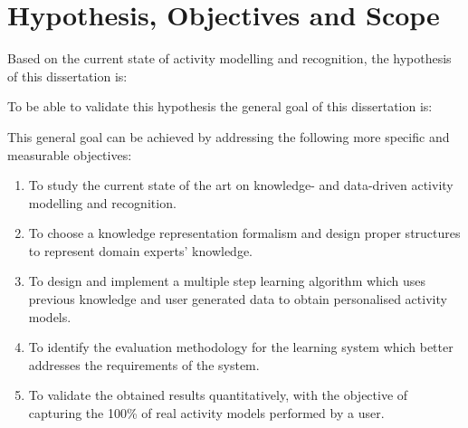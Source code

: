 \section{Hypothesis, Objectives and Scope}
\label{sec:intro:hypothesis}


Based on the current state of activity modelling and recognition, the hypothesis of this dissertation is:

\vspace{0.5cm}

\noindent{}

\vspace{0.5cm}

To be able to validate this hypothesis the general goal of this dissertation is:

\vspace{0.5cm}

\noindent{}

\vspace{0.5cm}



This general goal can be achieved by addressing the following more specific and measurable objectives:

\begin{enumerate}
 \item To study the current state of the art on knowledge- and data-driven activity modelling and recognition.
 \item To choose a knowledge representation formalism and design proper structures to represent domain experts' knowledge.
 \item To design and implement a multiple step learning algorithm which uses previous knowledge and user generated data to obtain personalised activity models.
 \item To identify the evaluation methodology for the learning system which better addresses the requirements of the system.
 \item To validate the obtained results quantitatively, with the objective of capturing the 100\% of real activity models performed by a user. 
\end{enumerate}

